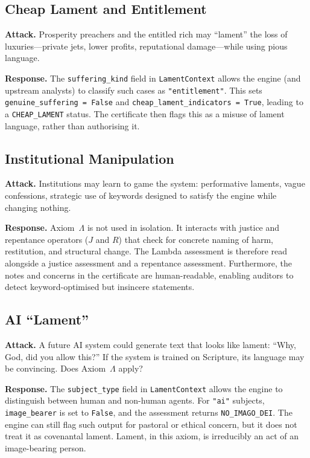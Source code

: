 \documentclass[11pt]{article}
\begin{document}
\subsection{Cheap Lament and Entitlement}

\textbf{Attack.} Prosperity preachers and the entitled rich may ``lament'' the loss of luxuries---private jets, lower profits, reputational damage---while using pious language.

\textbf{Response.} The \texttt{suffering\_kind} field in \texttt{LamentContext} allows the engine (and upstream analysts) to classify such cases as \texttt{"entitlement"}. This sets \texttt{genuine\_suffering = False} and \texttt{cheap\_lament\_indicators = True}, leading to a \texttt{CHEAP\_LAMENT} status. The certificate then flags this as a misuse of lament language, rather than authorising it.

\subsection{Institutional Manipulation}

\textbf{Attack.} Institutions may learn to game the system: performative laments, vague confessions, strategic use of keywords designed to satisfy the engine while changing nothing.

\textbf{Response.} Axiom~$\Lambda$ is not used in isolation. It interacts with justice and repentance operators ($J$ and $R$) that check for concrete naming of harm, restitution, and structural change. The Lambda assessment is therefore read alongside a justice assessment and a repentance assessment. Furthermore, the notes and concerns in the certificate are human-readable, enabling auditors to detect keyword-optimised but insincere statements.

\subsection{AI ``Lament''}

\textbf{Attack.} A future AI system could generate text that looks like lament: ``Why, God, did you allow this?'' If the system is trained on Scripture, its language may be convincing. Does Axiom~$\Lambda$ apply?

\textbf{Response.} The \texttt{subject\_type} field in \texttt{LamentContext} allows the engine to distinguish between human and non-human agents. For \texttt{"ai"} subjects, \texttt{image\_bearer} is set to \texttt{False}, and the assessment returns \texttt{NO\_IMAGO\_DEI}. The engine can still flag such output for pastoral or ethical concern, but it does not treat it as covenantal lament. Lament, in this axiom, is irreducibly an act of an image-bearing person.
\end{document}
